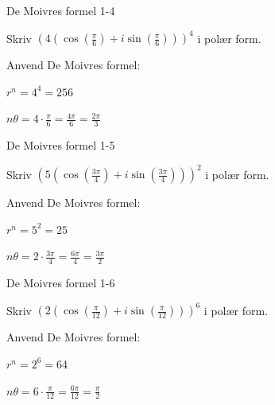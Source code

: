 \documentclass{article}
\begin{document}
\newpage

\begin{exercise}{De Moivres formel 1-4}

Skriv $(4(\cos(\frac{\pi}{6}) + i\sin(\frac{\pi}{6})))^4$ i polær form.


\hint

Anvend De Moivres formel:

\hint

$r^n = 4^4 = 256$

\hint

$n\theta = 4\cdot\frac{\pi}{6} = \frac{4\pi}{6} = \frac{2\pi}{3}$

\end{exercise}

\newpage

\begin{exercise}{De Moivres formel 1-5}

Skriv $(5(\cos(\frac{3\pi}{4}) + i\sin(\frac{3\pi}{4})))^2$ i polær form.


\hint

Anvend De Moivres formel:

\hint

$r^n = 5^2 = 25$

\hint

$n\theta = 2\cdot\frac{3\pi}{4} = \frac{6\pi}{4} = \frac{3\pi}{2}$

\end{exercise}

\newpage

\begin{exercise}{De Moivres formel 1-6}

Skriv $(2(\cos(\frac{\pi}{12}) + i\sin(\frac{\pi}{12})))^6$ i polær form.


\hint

Anvend De Moivres formel:

\hint

$r^n = 2^6 = 64$

\hint

$n\theta = 6\cdot\frac{\pi}{12} = \frac{6\pi}{12} = \frac{\pi}{2}$

\end{exercise}
\end{document}

